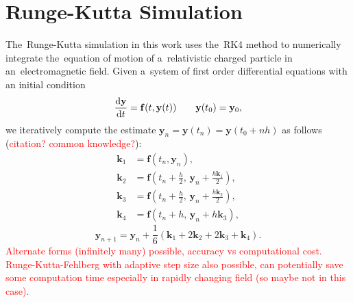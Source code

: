	\section{Runge-Kutta Simulation}
	\label{sec:rks}
		The~Runge-Kutta simulation in this work uses the~\ac{RK4} method to numerically integrate the~equation of motion of a~relativistic charged particle in an~electromagnetic field. Given a~system of first order differential equations with an initial condition
			\begin{equation}
				\derivative{\mathbf{y}}{t}(t) = \mathbf{f}(t,\mathbf{y}(t)) \qquad \mathbf{y}(t_0) = \mathbf{y}_0,
			\end{equation}
		we iteratively compute the estimate $\mathbf{y}_n = \mathbf{y}(t_n) = \mathbf{y}(t_0+nh)$ as follows (\textcolor{red}{citation? common knowledge?}):
			\begin{align}
				\mathbf{k}_1 &= \mathbf{f}(t_n,\mathbf{y}_n),\\
				\mathbf{k}_2 &= \mathbf{f}\left(t_n+\frac{h}{2},\, \mathbf{y}_n+\frac{h\mathbf{k}_1}{2}\right),\\
				\mathbf{k}_3 &= \mathbf{f}\left(t_n+\frac{h}{2},\, \mathbf{y}_n+\frac{h\mathbf{k}_2}{2}\right),\\
				\mathbf{k}_4 &= \mathbf{f}(t_n+h,\, \mathbf{y}_n+h\mathbf{k}_3),
			\end{align}
			\begin{equation}
				\mathbf{y}_{n+1} = \mathbf{y}_n + \frac{1}{6}(\mathbf{k}_1+2\mathbf{k}_2+2\mathbf{k}_3+\mathbf{k}_4).
			\end{equation}
		\textcolor{red}{Alternate forms (infinitely many) possible, accuracy vs computational cost. Runge-Kutta-Fehlberg with adaptive step size also possible, can potentially save some computation time especially in rapidly changing field (so maybe not in this case).}
		

